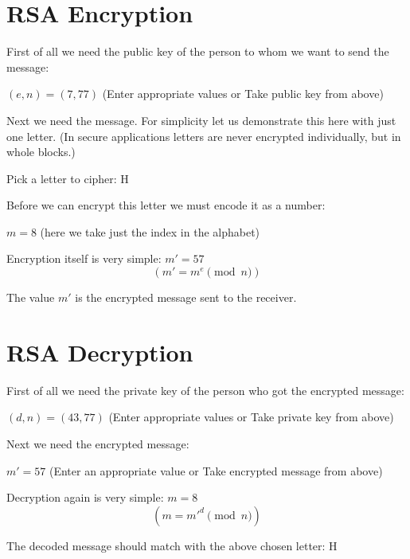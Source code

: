 \documentclass{article}
\begin{document}

\section*{RSA Encryption}

First of all we need the public key of the person to whom we want to send the message:

$(e, n) = (7, 77)$ (Enter appropriate values or Take public key from above)

Next we need the message. For simplicity let us demonstrate this here with just one letter. (In secure applications letters are never encrypted individually, but in whole blocks.)

Pick a letter to cipher: H

Before we can encrypt this letter we must encode it as a number:

$m = 8$ (here we take just the index in the alphabet)

Encryption itself is very simple: $m' = 57$ \[ (m' = m^e \pmod n) \]

The value $m'$ is the encrypted message sent to the receiver.

\vspace{10mm}

\section*{RSA Decryption}

First of all we need the private key of the person who got the encrypted message:

$(d, n) = (43, 77)$ (Enter appropriate values or Take private key from above)

Next we need the encrypted message:

$m' = 57$ (Enter an appropriate value or Take encrypted message from above)

Decryption again is very simple: $m = 8$ \[ (m = m'^d \pmod n) \]

The decoded message should match with the above chosen letter: H
\end{document}
